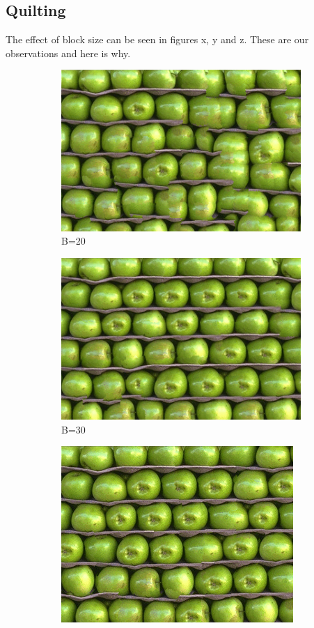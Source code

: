 \documentclass[10pt,twocolumn,letterpaper]{article}
\begin{document}
\subsection{Quilting}
The effect of block size can be seen in figures x, y and z. These are our observations and here is why.
\begin{figure}[h]
    \centering
    \begin{subfigure}[h]{0.2\textwidth}
        \centering
        \includegraphics[scale=0.25]{../results/syn/out_apples_B_20.png}
        \caption{B=20}
    \end{subfigure}
    \hfill
    \begin{subfigure}[h]{0.2\textwidth}
       \centering
       \includegraphics[scale=0.25]{../results/syn/out_apples_B_30.png}
       \caption{B=30}
   \end{subfigure}
   \hfill
   \begin{subfigure}[h]{0.2\textwidth}
       \centering
       \includegraphics[scale=0.25]{../results/syn/out_apples_B_40.png}

\end{subfigure}
\end{figure}
\end{document}

